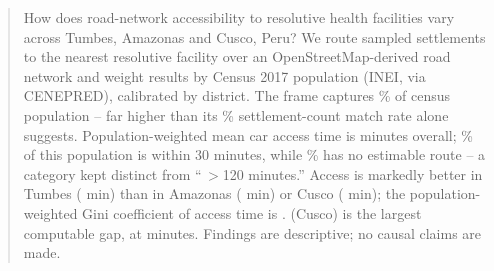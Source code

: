 \begin{abstract}
\noindent
How does road-network accessibility to resolutive health facilities vary across Tumbes, Amazonas and Cusco, Peru? We route \SampleSize{} sampled settlements to the nearest resolutive facility over an OpenStreetMap-derived road network and weight results by Census 2017 population (INEI, via CENEPRED), calibrated by district. The frame captures \FrameCoveragePct\% of census population -- far higher than its \PopulationMatchedPct\% settlement-count match rate alone suggests. Population-weighted mean car access time is \MeanAccessTotal{} minutes overall; \CovLeThirtyTotal\% of this population is within 30 minutes, while \CovNoTimeTotal\% has no estimable route -- a category kept distinct from ``\,$>$120 minutes.'' Access is markedly better in Tumbes (\MeanAccessTumbes{} min) than in Amazonas (\MeanAccessAmazonas{} min) or Cusco (\MeanAccessCusco{} min); the population-weighted Gini coefficient of access time is \GiniCalibrated. \TopOneDistrict{} (Cusco) is the largest computable gap, at \TopOneTime{} minutes. Findings are descriptive; no causal claims are made.
\end{abstract}

